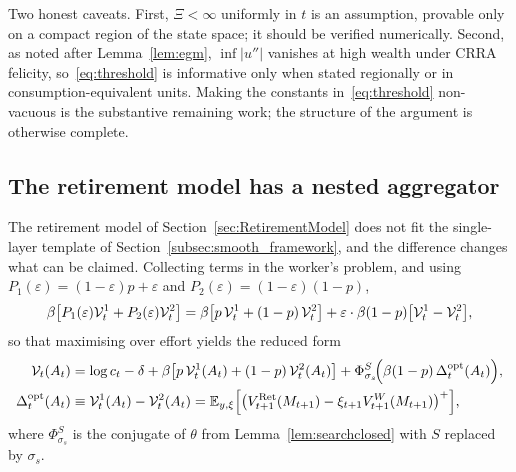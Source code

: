 Two honest caveats. First, $\Xi<\infty$ uniformly in $t$ is an assumption, provable
only on a compact region of the state space; it should be verified numerically.
Second, as noted after Lemma~\ref{lem:egm}, $\inf|u''|$ vanishes at high wealth under
CRRA felicity, so~\eqref{eq:threshold} is informative only when stated regionally or in
consumption-equivalent units. Making the constants in~\eqref{eq:threshold}
non-vacuous is the substantive remaining work; the structure of the argument is
otherwise complete.

\subsection{The retirement model has a nested aggregator}
\label{subsec:smooth_retirement}

The retirement model of Section~\ref{sec:RetirementModel} does not fit the single-layer
template of Section~\ref{subsec:smooth_framework}, and the difference changes what can
be claimed. Collecting terms in the worker's problem, and using
$P_1(\varepsilon)=(1-\varepsilon)p+\varepsilon$ and $P_2(\varepsilon)=(1-\varepsilon)(1-p)$,
\begin{align}
\beta\big[P_1(\varepsilon)\mathcal{V}_t^{1}+P_2(\varepsilon)\mathcal{V}_t^{2}\big]
= \beta\big[p\,\mathcal{V}_t^{1}+(1-p)\,\mathcal{V}_t^{2}\big]
+ \varepsilon\cdot\beta(1-p)\big[\mathcal{V}_t^{1}-\mathcal{V}_t^{2}\big],
\end{align}
so that maximising over effort yields the reduced form
\begin{align}
\mathcal{V}_t(A_t)
&= \log c_t - \delta
+ \beta\big[p\,\mathcal{V}_t^{1}(A_t)+(1-p)\,\mathcal{V}_t^{2}(A_t)\big]
+ \Phi^{S}_{\sigma_s}\!\Big(\beta(1-p)\,\Delta_t^{\mathrm{opt}}(A_t)\Big),
\label{eq:ret_reduced}\\
\Delta_t^{\mathrm{opt}}(A_t)
&\equiv \mathcal{V}_t^{1}(A_t)-\mathcal{V}_t^{2}(A_t)
= \mathbb{E}_{y,\xi}\Big[\big(V_{t+1}^{\mathrm{Ret}}(M_{t+1})-\xi_{t+1}V_{t+1}^{W}(M_{t+1})\big)^{+}\Big],
\label{eq:ret_optiongap}
\end{align}
where $\Phi^{S}_{\sigma_s}$ is the conjugate of $\theta$ from
Lemma~\ref{lem:searchclosed} with $S$ replaced by $\sigma_s$.

